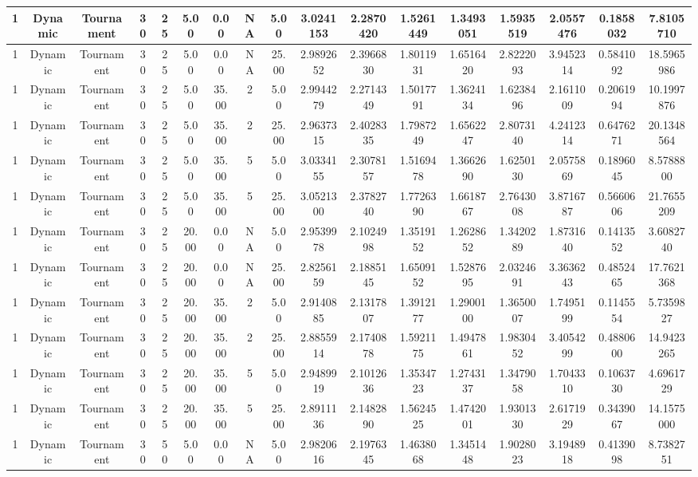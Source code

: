 \begin{longtable}{ | c | c | c | c | c | c | c | c | c | c | c | c | c | c | c | c | c | }
	\hline
	1	&	Dynamic	&	Tournament	&	30	&	25	&	5.00	&	0.00	&	NA	&	5.00	&	3.0241153	&	2.2870420	&	1.5261449	&	1.3493051	&	1.5935519	&	2.0557476	&	0.1858032	&	7.8105710 \\
	\hline
	1	&	Dynamic	&	Tournament	&	30	&	25	&	5.00	&	0.00	&	NA	&	25.00	&	2.9892652	&	2.3966830	&	1.8011931	&	1.6516420	&	2.8222093	&	3.9452314	&	0.5841092	&	18.5965986 \\
	\hline
	1	&	Dynamic	&	Tournament	&	30	&	25	&	5.00	&	35.00	&	2	&	5.00	&	2.9944279	&	2.2714349	&	1.5017791	&	1.3624134	&	1.6238496	&	2.1611009	&	0.2061994	&	10.1997876 \\
	\hline
	1	&	Dynamic	&	Tournament	&	30	&	25	&	5.00	&	35.00	&	2	&	25.00	&	2.9637315	&	2.4028335	&	1.7987249	&	1.6562247	&	2.8073140	&	4.2412314	&	0.6476271	&	20.1348564 \\
	\hline
	1	&	Dynamic	&	Tournament	&	30	&	25	&	5.00	&	35.00	&	5	&	5.00	&	3.0334155	&	2.3078157	&	1.5169478	&	1.3662690	&	1.6250130	&	2.0575869	&	0.1896045	&	8.5788800 \\
	\hline
	1	&	Dynamic	&	Tournament	&	30	&	25	&	5.00	&	35.00	&	5	&	25.00	&	3.0521300	&	2.3782740	&	1.7726390	&	1.6618767	&	2.7643008	&	3.8716787	&	0.5660606	&	21.7655209 \\
	\hline
	1	&	Dynamic	&	Tournament	&	30	&	25	&	20.00	&	0.00	&	NA	&	5.00	&	2.9539978	&	2.1024998	&	1.3519152	&	1.2628652	&	1.3420289	&	1.8731640	&	0.1413552	&	3.6082740 \\
	\hline
	1	&	Dynamic	&	Tournament	&	30	&	25	&	20.00	&	0.00	&	NA	&	25.00	&	2.8256159	&	2.1885145	&	1.6509152	&	1.5287695	&	2.0324691	&	3.3636243	&	0.4852465	&	17.7621368 \\
	\hline
	1	&	Dynamic	&	Tournament	&	30	&	25	&	20.00	&	35.00	&	2	&	5.00	&	2.9140885	&	2.1317807	&	1.3912177	&	1.2900100	&	1.3650007	&	1.7495199	&	0.1145554	&	5.7359827 \\
	\hline
	1	&	Dynamic	&	Tournament	&	30	&	25	&	20.00	&	35.00	&	2	&	25.00	&	2.8855914	&	2.1740878	&	1.5921175	&	1.4947861	&	1.9830452	&	3.4054299	&	0.4880600	&	14.9423265 \\
	\hline
	1	&	Dynamic	&	Tournament	&	30	&	25	&	20.00	&	35.00	&	5	&	5.00	&	2.9489919	&	2.1012636	&	1.3534723	&	1.2743137	&	1.3479058	&	1.7043310	&	0.1063730	&	4.6961729 \\
	\hline
	1	&	Dynamic	&	Tournament	&	30	&	25	&	20.00	&	35.00	&	5	&	25.00	&	2.8911136	&	2.1482890	&	1.5624525	&	1.4742001	&	1.9301330	&	2.6171929	&	0.3439067	&	14.1575000 \\
	\hline
	1	&	Dynamic	&	Tournament	&	30	&	50	&	5.00	&	0.00	&	NA	&	5.00	&	2.9820616	&	2.1976345	&	1.4638068	&	1.3451448	&	1.9028023	&	3.1948918	&	0.4139098	&	8.7382751 \\

\end{longtable}
